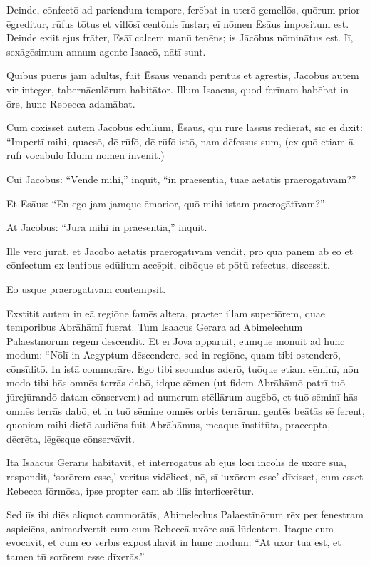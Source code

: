 \Versus Deinde, cōnfectō ad pariendum tempore, ferēbat in uterō gemellōs,
\Versus quōrum prior ēgreditur, rūfus tōtus et villōsī centōnis īnstar; eī nōmen Ēsāus impositum est.
\Versus Deinde exiit ejus frāter, Ēsāī calcem manū tenēns; is Jācōbus nōminātus est. Iī, sexāgēsimum annum agente Isaacō, nātī sunt.

\Versus Quibus puerīs jam adultīs, fuit Ēsāus vēnandī perītus et agrestis, Jācōbus autem vir integer, tabernāculōrum habitātor.
\Versus Illum Isaacus, quod ferīnam habēbat in ōre, hunc Rebecca adamābat.

\Versus Cum coxisset autem Jācōbus edūlium, Ēsāus, quī rūre lassus redierat, sīc eī dīxit:
\Versus ``Impertī mihi, quaesō, dē rūfō, dē rūfō istō, nam dēfessus sum, (ex quō etiam ā rūfī vocābulō Idūmī nōmen invenit.)

\Versus Cui Jācōbus: ``Vēnde mihi,'' inquit, ``in praesentiā, tuae aetātis praerogātīvam?''

\Versus Et Ēsāus: ``Ēn ego jam jamque ēmorior, quō mihi istam praerogātīvam?''

\Versus At Jācōbus: ``Jūra mihi in praesentiā,'' inquit.

Ille vērō jūrat, et Jācōbō aetātis praerogātīvam vēndit,
\Versus prō quā pānem ab eō et cōnfectum ex lentibus edūlium accēpit, cibōque et pōtū refectus, discessit.

Eō ūsque praerogātīvam contempsit.



\Caput
\Versus Exstitit autem in eā regiōne famēs altera, praeter illam superiōrem, quae temporibus Abrāhāmī fuerat. Tum Isaacus Gerara ad Abimelechum Palaestīnōrum rēgem dēscendit.
\Versus Et eī Jōva appāruit, eumque monuit ad hunc modum: ``Nōlī in Aegyptum dēscendere, sed in regiōne, quam tibi ostenderō, cōnsīditō.
\Versus  In istā commorāre. Ego tibi secundus aderō, tuōque etiam sēminī, nōn modo tibi hās omnēs terrās dabō, idque sēmen (ut fidem Abrāhāmō patrī tuō jūrejūrandō datam cōnservem)
\Versus ad numerum stēllārum augēbō, et tuō sēminī hās omnēs terrās dabō, et in tuō sēmine omnēs orbis terrārum gentēs beātās sē ferent,
\Versus quoniam mihi dictō audiēns fuit Abrāhāmus, meaque īnstitūta, praecepta, dēcrēta, lēgēsque cōnservāvit.

\Versus Ita Isaacus Gerārīs habitāvit,
\Versus et interrogātus ab ejus locī incolīs dē uxōre suā, respondit, `sorōrem esse,' veritus vidēlicet, nē, sī `uxōrem esse' dīxisset, cum esset Rebecca fōrmōsa, ipse propter eam ab illīs interficerētur.

\Versus Sed iīs ibi diēs aliquot commorātīs, Abimelechus Palaestīnōrum rēx per fenestram aspiciēns, animadvertit eum cum Rebeccā uxōre suā lūdentem.
\Versus Itaque eum ēvocāvit, et cum eō verbīs expostulāvit in hunc modum: ``At uxor tua est, et tamen tū sorōrem esse dīxerās.''

